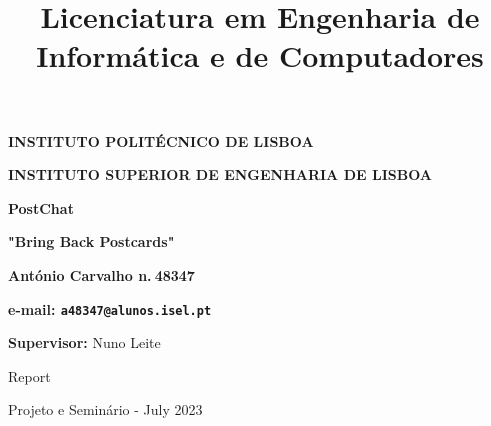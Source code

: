 \thispagestyle{empty}

\begin{figure}[ht!]
	\centering
\end{figure}


\centerline{\Large\textbf{INSTITUTO POLIT\'{E}CNICO DE LISBOA}}
\bigskip
\centerline{\Large\textbf{INSTITUTO SUPERIOR DE ENGENHARIA DE LISBOA}}


\bigskip
\bigskip

\title{{\large Licenciatura em Engenharia de Inform\'{a}tica e de Computadores}}

\bigskip
\bigskip

\begin{center}

 
{\LARGE \textbf{PostChat}}

\bigskip
{\Large \textbf{"Bring Back Postcards"}}

\bigskip
\bigskip
\bigskip
\bigskip
\bigskip
\bigskip
\bigskip
\bigskip



{\Large \textbf{\vspace*{1em}Ant\'{o}nio Carvalho n.\textdegree $\ $48347}}

{\Large \textbf{e-mail: \texttt{a48347@alunos.isel.pt}}}

\bigskip
\bigskip
\bigskip
\bigskip

{\Large \textbf{\vspace*{1em}Supervisor:} Nuno Leite} 



\bigskip
\bigskip
\bigskip




{\Large Report}

\bigskip
\bigskip


{\Large Projeto e Semin\'{a}rio - July 2023}


\end{center}
